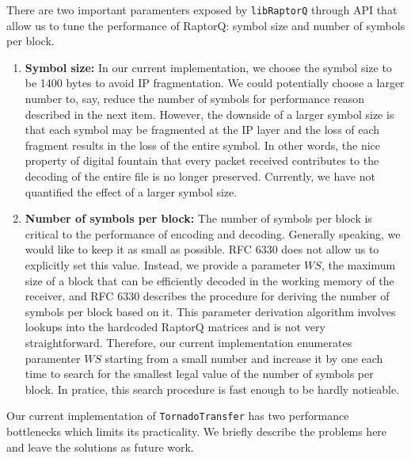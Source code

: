 \documentclass{sig-alternate-10pt}
\begin{document}
There are two important paramenters exposed by \texttt{libRaptorQ} through API that allow us to tune the performance of RaptorQ: symbol size and number of symbols per block.
\begin{enumerate}[label=(\alph*)]
\item \textbf{Symbol size:} In our current implementation, we choose the symbol size to be 1400 bytes to avoid IP fragmentation. We could potentially choose a larger number to, say, reduce the number of symbols for performance reason  described in the next item. However, the downside of a larger symbol size is that each symbol may be fragmented at the IP layer and the loss of each fragment results in the loss of the entire symbol. In other words, the nice property of digital fountain that every packet received contributes to the decoding of the entire file is no longer preserved. Currently, we have not quantified the effect of a larger symbol size.
\item \textbf{Number of symbols per block:} The number of symbols per block is critical to the performance of encoding and decoding. Generally speaking, we would like to keep it as small as possible. RFC 6330 does not allow us to explicitly set this value. Instead, we provide a parameter $WS$, the maximum size of a block that can be efficiently decoded in the working memory of the receiver, and RFC 6330 describes the procedure for deriving the number of symbols per block based on it. This parameter derivation algorithm involves lookups into the hardcoded RaptorQ matrices and is not very straightforward. Therefore, our current implementation enumerates paramenter $WS$ starting from a small number and increase it by one each time to search for the smallest legal value of the number of symbols per block. In pratice, this search procedure is fast enough to be hardly notieable.
\end{enumerate}


Our current implementation of \texttt{TornadoTransfer} has two performance bottlenecks which limits its practicality. We briefly describe the problems here and leave the solutions as future work.
\end{document}
